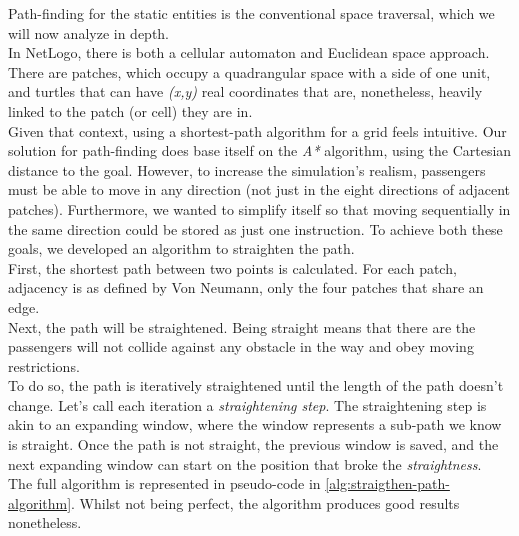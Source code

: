 Path-finding for the static entities is the conventional space traversal, which we will now analyze in depth. \\

In NetLogo, there is both a cellular automaton and Euclidean space approach. There are patches, which occupy a quadrangular space with a side of one unit, and turtles that can have \textit{(x,y)} real coordinates that are, nonetheless, heavily linked to the patch (or cell) they are in.  \\
Given that context, using a shortest-path algorithm for a grid feels intuitive. Our solution for path-finding does base itself on the \textit{A*} algorithm, using the Cartesian distance to the goal. However, to increase the simulation's realism, passengers must be able to move in any direction (not just in the eight directions of adjacent patches). Furthermore, we wanted to simplify itself so that moving sequentially in the same direction could be stored as just one instruction. To achieve both these goals, we developed an algorithm to straighten the path. \\
\newline
First, the shortest path between two points is calculated. For each patch, adjacency is as defined by Von Neumann, only the four patches that share an edge. \\
Next, the path will be straightened. Being straight means that there are the passengers will not collide against any obstacle in the way and obey moving restrictions.\\
To do so, the path is iteratively straightened until the length of the path doesn't change. Let's call each iteration a \textit{straightening step}. The straightening step is akin to an expanding window, where the window represents a sub-path we know is straight. Once the path is not straight, the previous window is saved, and the next expanding window can start on the position that broke the \textit{straightness}. \\
The full algorithm is represented in pseudo-code in \autoref{alg:straigthen-path-algorithm}.
Whilst not being perfect, the algorithm produces good results nonetheless.

